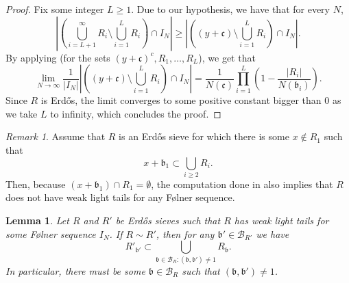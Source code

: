 \documentclass[a4paper,11pt,reqno]{amsart}
\theoremstyle{plain}
\newtheorem{lemma}[theorem]{Lemma}
\theoremstyle{remark}
\newtheorem{remark}[theorem]{Remark}
\newcommand{\cb}{\mathcal{B}}
\newcommand{\gb}{\mathfrak{b}}
\newcommand{\gc}{\mathfrak{c}}
\begin{document}
		\begin{proof}
			Fix some integer $L \geq 1$. Due to our hypothesis, we have that for every $N$,
			$$ \left|\left(\bigcup_{i=L+1}^\infty R_i  \setminus \bigcup_{i=1}^L R_i \right) \cap I_N \right| \geq \left|\left((y+\gc) \setminus \bigcup_{i=1}^L R_i\right)  \cap I_N\right|. $$  By applying   (for the sets $(y+\gc)^c,R_1,\dots,R_L$), we get that $$\lim_{N\rightarrow\infty} \frac{1}{|I_N|} \left|\left((y+\gc) \setminus \bigcup_{i=1}^L R_i\right)  \cap I_N\right| = \frac{1}{N(\gc)}\prod_{i=1}^L \left(1-\frac{|R_i|}{N(\gb_i)}\right).$$ Since $R$ is Erdős, the limit converges to some positive constant bigger than  $0$ as we take $L$ to infinity, which concludes the proof.
		\end{proof}
		
		\begin{remark}
			\label{rmk: if contains coprime ideal then no weak light tails}
			Assume that $R$ is an Erdős sieve for which there is some $x \not \in R_1$ such that $$x+\gb_1 \subset \bigcup_{i \geq 2} R_i.$$ Then, because  $ (x+\gb_1) \cap R_1  =\emptyset$, the computation done in   also implies that $R$ does not have weak light tails for any Følner sequence. 
		\end{remark}
		
		
		\begin{lemma}
			\label{lm: aux for Characterization of equivalent sieves}
			Let $R$ and $R'$ be Erdős sieves such that $R$ has weak light tails for some Følner sequence $I_N$. If $R \sim R'$, then for any $\gb' \in \cb_{R'}$ we have $$R'_{\gb'} \subset \bigcup_{\gb \in \cb_{R}:(\gb,\gb') \neq 1} R_{\gb}.$$ In particular, there must be some $\gb\in \cb_R$ such that $(\gb,\gb') \neq 1$.
		\end{lemma}
		
\end{document}

